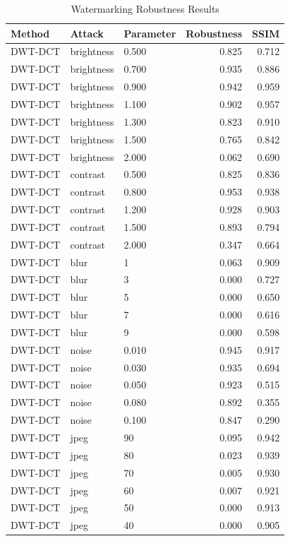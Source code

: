 \begin{table}
\caption{Watermarking Robustness Results}
\label{tab:watermark_results}
\begin{tabular}{lllrr}
\toprule
Method & Attack & Parameter & Robustness & SSIM \\
\midrule
DWT-DCT & brightness & 0.500 & 0.825 & 0.712 \\
DWT-DCT & brightness & 0.700 & 0.935 & 0.886 \\
DWT-DCT & brightness & 0.900 & 0.942 & 0.959 \\
DWT-DCT & brightness & 1.100 & 0.902 & 0.957 \\
DWT-DCT & brightness & 1.300 & 0.823 & 0.910 \\
DWT-DCT & brightness & 1.500 & 0.765 & 0.842 \\
DWT-DCT & brightness & 2.000 & 0.062 & 0.690 \\
DWT-DCT & contrast & 0.500 & 0.825 & 0.836 \\
DWT-DCT & contrast & 0.800 & 0.953 & 0.938 \\
DWT-DCT & contrast & 1.200 & 0.928 & 0.903 \\
DWT-DCT & contrast & 1.500 & 0.893 & 0.794 \\
DWT-DCT & contrast & 2.000 & 0.347 & 0.664 \\
DWT-DCT & blur & 1 & 0.063 & 0.909 \\
DWT-DCT & blur & 3 & 0.000 & 0.727 \\
DWT-DCT & blur & 5 & 0.000 & 0.650 \\
DWT-DCT & blur & 7 & 0.000 & 0.616 \\
DWT-DCT & blur & 9 & 0.000 & 0.598 \\
DWT-DCT & noise & 0.010 & 0.945 & 0.917 \\
DWT-DCT & noise & 0.030 & 0.935 & 0.694 \\
DWT-DCT & noise & 0.050 & 0.923 & 0.515 \\
DWT-DCT & noise & 0.080 & 0.892 & 0.355 \\
DWT-DCT & noise & 0.100 & 0.847 & 0.290 \\
DWT-DCT & jpeg & 90 & 0.095 & 0.942 \\
DWT-DCT & jpeg & 80 & 0.023 & 0.939 \\
DWT-DCT & jpeg & 70 & 0.005 & 0.930 \\
DWT-DCT & jpeg & 60 & 0.007 & 0.921 \\
DWT-DCT & jpeg & 50 & 0.000 & 0.913 \\
DWT-DCT & jpeg & 40 & 0.000 & 0.905 \\

\end{tabular}
\end{table}
